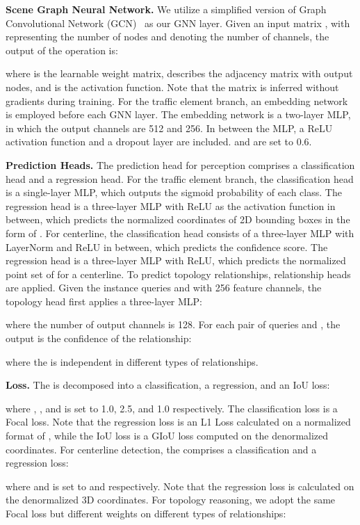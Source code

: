 \smallskip
\noindent
\textbf{Scene Graph Neural Network.}
We utilize a simplified version of Graph Convolutional Network (GCN)~\cite{kipf2016semi} as our GNN layer. 
Given an input matrix , with  representing the number of nodes and  denoting the number of channels, the output of the operation is:

where  is the learnable weight matrix,  describes the adjacency matrix with  output nodes, and  is the activation function. 
Note that the matrix  is inferred without gradients during training.
For the traffic element branch, an embedding network is employed before each GNN layer. The embedding network is a two-layer MLP, in which the output channels are 512 and 256.
In between the MLP, a ReLU activation function and a dropout layer are included.  and  are set to 0.6.

\smallskip
\noindent
\textbf{Prediction Heads.}
The prediction head for perception comprises a classification head and a regression head.
For the traffic element branch, the classification head is a single-layer MLP, which outputs the sigmoid probability of each class. 
The regression head is a three-layer MLP with ReLU as the activation function in between, which predicts the normalized coordinates of 2D bounding boxes in the form of .
For centerline, the classification head consists of a three-layer MLP with LayerNorm and ReLU in between, which predicts the confidence score. 
The regression head is a three-layer MLP with ReLU, which predicts the normalized point set of  for a centerline.
To predict topology relationships, relationship heads are applied.
Given the instance queries  and  with 256 feature channels, the topology head first applies a three-layer MLP:

where the number of output channels is 128.
For each pair of queries  and , the output is the confidence of the relationship:

where the  is independent in different types of relationships.

\smallskip
\noindent
\textbf{Loss.}
The  is decomposed into a classification, a regression, and an IoU loss:

where , , and  is set to 1.0, 2.5, and 1.0 respectively. 
The classification loss  is a Focal loss.
Note that the regression loss  is an L1 Loss calculated on a normalized format of , while the IoU loss  is a GIoU loss computed on the denormalized coordinates.
For centerline detection, the  comprises a classification and a regression loss:

where  and  is set to  and  respectively. 
Note that the regression loss is calculated on the denormalized 3D coordinates.
For topology reasoning, we adopt the same Focal loss but different weights on different types of relationships:

